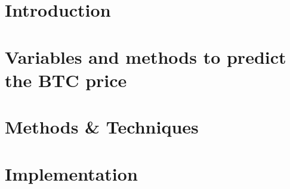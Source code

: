 \cleardoublepage %





\cleardoublepage %


\part{Introduction} %
\label{part:introduction}


\part{Variables and methods to predict the BTC price}
\label{part:variables}


\part{Methods \& Techniques}
\label{part:method-technique}


\part{Implementation}
\label{part:implementation}


